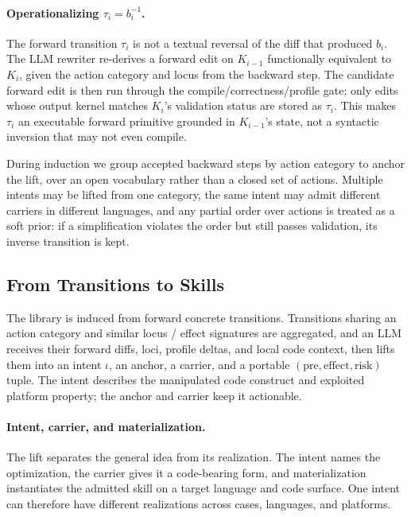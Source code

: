\paragraph{Operationalizing $\tau_i = b_i^{-1}$.}
The forward transition $\tau_i$ is not a textual reversal of the diff that produced $b_i$. The LLM rewriter re-derives a forward edit on $K_{i-1}$ functionally equivalent to $K_i$, given the action category and locus from the backward step. The candidate forward edit is then run through the compile/correctness/profile gate; only edits whose output kernel matches $K_i$'s validation status are stored as $\tau_i$. This makes $\tau_i$ an executable forward primitive grounded in $K_{i-1}$'s state, not a syntactic inversion that may not even compile.

During induction we group accepted backward steps by action category to anchor the lift, over an open vocabulary rather than a closed set of actions. Multiple intents may be lifted from one category, the same intent may admit different carriers in different languages, and any partial order over actions is treated as a soft prior: if a simplification violates the order but still passes validation, its inverse transition is kept.

\subsection{From Transitions to Skills}
\label{sec:method-extract}

The library is induced from forward concrete transitions. Transitions sharing an action category and similar locus / effect signatures are aggregated, and an LLM receives their forward diffs, loci, profile deltas, and local code context, then lifts them into an intent $\iota$, an anchor, a carrier, and a portable $(\mathrm{pre}, \mathrm{effect}, \mathrm{risk})$ tuple. The intent describes the manipulated code construct and exploited platform property; the anchor and carrier keep it actionable.

\paragraph{Intent, carrier, and materialization.}
The lift separates the general idea from its realization. The intent names the optimization, the carrier gives it a code-bearing form, and materialization instantiates the admitted skill on a target language and code surface. One intent can therefore have different realizations across cases, languages, and platforms.


